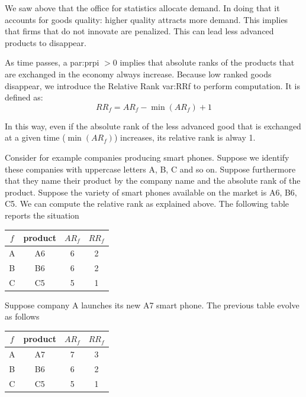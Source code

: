 \documentclass{book}
\begin{document}
\vskip3mm
We saw above that the office for statistics allocate demand. In doing that it accounts for goods quality: higher quality attracts more demand.
This implies that firms that do not innovate are penalized. This can lead less advanced products to disappear. 

As time passes, a \gls{par:prpi} $>0$ implies that absolute ranks of the products that are exchanged in the economy always increase. Because low ranked goods disappear, we introduce the Relative Rank  \gls{var:RRf} to perform computation. It is defined as:
\[
RR_f=AR_f-\min(AR_f)+1
\]



In this way, even if the absolute rank of the less advanced good that is exchanged at a given time ($\min(AR_f)$) increases, its relative rank is alway 1.

Consider for example companies producing smart phones. Suppose we identify these companies with uppercase letters A, B, C and so on. Suppose furthermore that they name their product by the company name and the absolute rank of the product. Suppose the variety of smart phones available on the market is A6, B6, C5. We can compute the relative rank as explained above. The following table reports the situation
\begin{center}
\begin{tabular}{c c c c}
	\hline
	$f$ & product & $AR_f$ & $RR_f$\\
	\hline
	A & A6 & 6 & 2\\
	B & B6 & 6 & 2\\
	C & C5 & 5 & 1\\
	\hline
\end{tabular}
\end{center}

Suppose company A launches its new A7 smart phone. The previous table evolve as follows
\begin{center}
\begin{tabular}{c c c c}
	\hline
	$f$ & product & $AR_f$ & $RR_f$\\
	\hline
	A & A7 & 7 & 3\\
	B & B6 & 6 & 2\\
	C & C5 & 5 & 1\\
	\hline
\end{tabular}
\end{center}
\end{document}
